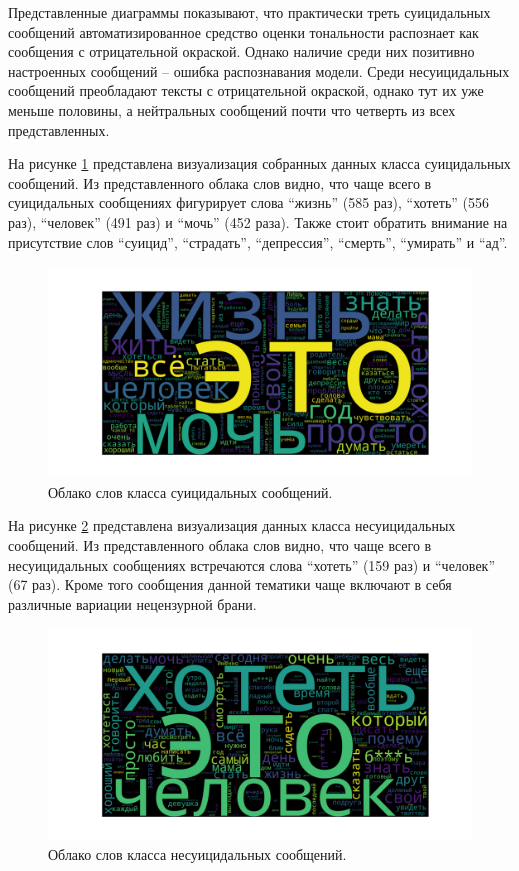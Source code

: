 Представленные диаграммы показывают, что практически треть суицидальных сообщений автоматизированное средство оценки тональности распознает как сообщения с отрицательной окраской. Однако наличие среди них позитивно настроенных сообщений -- ошибка распознавания модели. Среди несуицидальных сообщений преобладают тексты с отрицательной окраской, однако тут их уже меньше половины, а нейтральных сообщений почти что четверть из всех представленных. 

На рисунке \ref{img:cloud1} представлена визуализация собранных данных класса суицидальных сообщений. Из представленного облака слов видно, что чаще всего в суицидальных сообщениях фигурирует слова ``жизнь'' (585 раз), ``хотеть'' (556 раз), ``человек'' (491 раз) и ``мочь'' (452 раза). Также стоит обратить внимание на присутствие слов ``суицид'', ``страдать'', ``депрессия'', ``смерть'', ``умирать'' и ``ад''.

\begin{figure}[H]
	\centering
	\includegraphics[width=\textwidth]{inc/cloudSuicidal.pdf}
	\caption{ Облако слов класса суицидальных сообщений. }
	\label{img:cloud1}
\end{figure}

На рисунке \ref{img:cloud2} представлена визуализация данных класса несуицидальных сообщений. Из представленного облака слов видно, что чаще всего в несуицидальных сообщениях встречаются слова ``хотеть'' (159 раз) и ``человек'' (67 раз). Кроме того сообщения данной тематики чаще включают в себя различные вариации нецензурной брани.

\begin{figure}[H]
	\centering
	\includegraphics[width=\textwidth]{inc/cloudNonSuicidal.pdf}
	\caption{ Облако слов класса несуицидальных сообщений. }
	\label{img:cloud2}
\end{figure}

